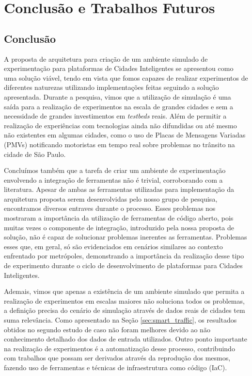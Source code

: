\chapter{Conclusão e Trabalhos Futuros}
\label{cap:conclusao}

\section{Conclusão}

%
%
%

A proposta de arquitetura para criação de um ambiente simulado de experimentação para plataformas de Cidades Inteligentes se apresentou como uma solução viável, tendo em vista que fomos capazes de
realizar experimentos de diferentes naturezas utilizando implementações feitas seguindo a solução apresentada.
Durante a pesquisa, vimos que a utilização de simulação é uma saída para a realização de experimentos na escala de grandes cidades e sem a necessidade de grandes investimentos em \textit{testbeds} reais.
Além de permitir a realização de experiências com tecnologias ainda não difundidas ou até mesmo não existentes em algumas cidades, como o uso de Placas de Mensagens Variadas (PMVs) notificando motoristas
em tempo real sobre problemas no trânsito na cidade de São Paulo.

Concluímos também que a tarefa de criar um ambiente de experimentação envolvendo a integração de ferramentas não é trivial, corroborando com a literatura.
Apesar de ambas as ferramentas utilizadas para implementação da arquitetura proposta serem desenvolvidas pelo nosso grupo de pesquisa, encontramos diversos entraves durante o processo.
Esses problemas nos mostraram a importância da utilização de ferramentas de código aberto, pois muitas vezes o componente de integração, introduzido pela nossa proposta de solução, não é capaz de
solucionar problemas inerentes as ferramentas.
Problemas esses que, em geral, só são evidenciados em cenários similares ao contexto enfrentado por metrópoles, demonstrando a importância da realização desse tipo de experimento durante o ciclo de
desenvolvimento de plataformas para Cidades Inteligentes.

Ademais, vimos que apenas a existência de um ambiente simulado que permita a realização de experimentos em escalas maiores não soluciona todos os problemas, a definição precisa do cenário de simulação
através de dados reais de cidades tem suma relevância.
Como apresentado na Seção \ref{sec:smart_traffic}, os resultados obtidos no segundo estudo de caso não foram melhores devido ao não conhecimento detalhado dos dados de entrada utilizados.
Outro ponto importante na realização de experimentos é a automatização desse processo, contribuindo com trabalhos que possam ser derivados através da reprodução dos mesmos, fazendo uso de ferramentas
e técnicas de infraestrutura como código (IaC).

